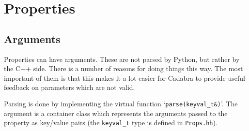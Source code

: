 
\section{Properties}

\subsection{Arguments}

Properties can have arguments. These are not parsed by Python, but
rather by the C++ side. There is a number of reasons for doing things
this way. The most important of them is that this makes it a lot
easier for Cadabra to provide useful feedback on parameters which are
not valid.

Parsing is done by implementing the virtual function
`\verb|parse(keyval_t&)|'. The argument is a container class which
represents the arguments passed to the property as key/value pairs
(the \verb|keyval_t| type is defined in \verb|Props.hh|).

